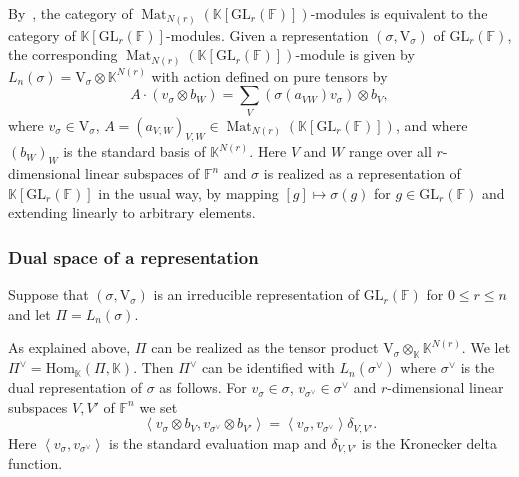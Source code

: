 \documentclass[12pt, reqno]{amsart}
\theoremstyle{definition}
\newcommand{\coefficientsField}{\mathbb{K}}
\newcommand{\Hom}{\mathrm{Hom}}
\newcommand{\innerproduct}[2]{\left\langle #1,#2\right\rangle}
\newcommand{\GL}{\mathrm{GL}}
\newcommand{\finiteField}{\mathbb{F}}
\newcommand{\squareMatrix}{\operatorname{Mat}}
\begin{document}
	By~\cite[Example A.27]{Steinberg2016}, the category of $\squareMatrix_{N\left(r\right)}\left(\coefficientsField\left[\GL_r\left(\finiteField\right)\right]\right)$-modules is equivalent to the category of $\coefficientsField\left[\GL_r\left(\finiteField\right)\right]$-modules. Given a representation $\left(\sigma, \mathrm{V}_{\sigma}\right)$ of $\GL_r\left(\finiteField\right)$, the corresponding $\squareMatrix_{N\left(r\right)}\left(\coefficientsField\left[\GL_r\left(\finiteField\right)\right]\right)$-module is given by $L_n\left(\sigma\right) = \mathrm{V}_{\sigma} \otimes \coefficientsField^{N\left(r\right)}$ with action defined on pure tensors by
	\begin{displaymath}
	A \cdot \left(v_{\sigma} \otimes b_W\right) = \sum_{V} \left(\sigma\left(a_{VW}\right) v_{\sigma}\right) \otimes b_V,
	\end{displaymath}
	where $v_{\sigma} \in \mathrm{V}_{\sigma}$, $A = \left(a_{V,W}\right)_{V,W} \in \squareMatrix_{N\left(r\right)}\left(\coefficientsField\left[\GL_r\left(\finiteField\right)\right]\right)$, and where $\left(b_W\right)_{W}$ is the standard basis of $\coefficientsField^{N\left(r\right)}$. Here $V$ and $W$ range over all $r$-dimensional linear subspaces of $\finiteField^n$ and $\sigma$ is realized as a representation of $\coefficientsField\left[\GL_r\left(\finiteField\right)\right]$ in the usual way, by mapping $\left[g\right] \mapsto \sigma\left(g\right)$ for $g \in \GL_r\left(\finiteField\right)$ and extending linearly to arbitrary elements.
	
	\subsubsection{Dual space of a representation}
	Suppose that $\left(\sigma, \mathrm{V}_{\sigma}\right)$ is an irreducible representation of $\GL_r\left(\finiteField\right)$ for $0 \le r \le n$ and let $\Pi = L_n\left(\sigma\right)$.
	
	As explained above, $\Pi$ can be realized as the tensor product $\mathrm{V}_{\sigma} \otimes_{\coefficientsField} \coefficientsField^{N\left(r\right)}$. We let $\Pi^{\vee} = \Hom_{\coefficientsField}\left(\Pi, \coefficientsField\right)$. Then $\Pi^{\vee}$ can be identified with $L_n\left(\sigma^{\vee}\right)$ where $\sigma^{\vee}$ is the dual representation of $\sigma$ as follows. For $v_{\sigma} \in \sigma$, $v_{\sigma^{\vee}} \in \sigma^{\vee}$ and $r$-dimensional linear subspaces $V, V'$ of $\finiteField^n$ we set
	\begin{displaymath}
		\innerproduct{v_{\sigma} \otimes b_{V}}{v_{\sigma^{\vee}} \otimes b_{V'}} = \innerproduct{v_{\sigma}}{v_{\sigma^{\vee}}} \delta_{V, V'}.
	\end{displaymath}
	Here $\innerproduct{v_{\sigma}}{v_{\sigma^{\vee}}}$ is the standard evaluation map and $\delta_{V,V'}$ is the Kronecker delta function.
	
\end{document}
